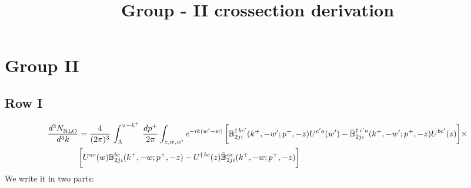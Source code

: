 \documentclass[9pt]{article}
\title{Group - II crossection derivation}
\author{}
\date{}
\def\mf#1{\mathbb{#1}}
\numberwithin{equation}{section}
\begin{document}
\maketitle
\section{Group II}
\subsection{Row I\,}
\begin{align}
    \frac{d^{3}N_{\rm NLO}^{\rm}}{d^{3}k}  & = \frac{4}{(2\pi)^{3}}\,\int_{\Lambda}^{\vee-k^{+}}\, \frac{dp^{+}}{2\pi}\int_{z,w,w^{\prime}} e^{-ik(w^{\prime}-w)}\, \bigg[\mf{B}^{\dagger\, bc^{\prime}}_{2ji}(k^{+},-w^{\prime};p^{+},-z)U^{ c^{\prime}a}(w^{\prime}) -\Bar{\mf{B}}^{\dagger\, c^{\prime}a}_{2ji}(k^{+},-w^{\prime}; p^{+},-z)U^{bc^{\prime}}(z)\bigg]\times\notag \\ & \bigg[U^{ac}(w) \mf{B}^{bc}_{2ji}(k^{+},-w;p^{+},-z) -U^{\dagger\, bc}(z)\Bar{\mf{B}}^{ca}_{2ji}(k^{+},-w; p^{+},-z)\bigg]\nonumber
\end{align}
We write it in two parts: 
\end{document}
